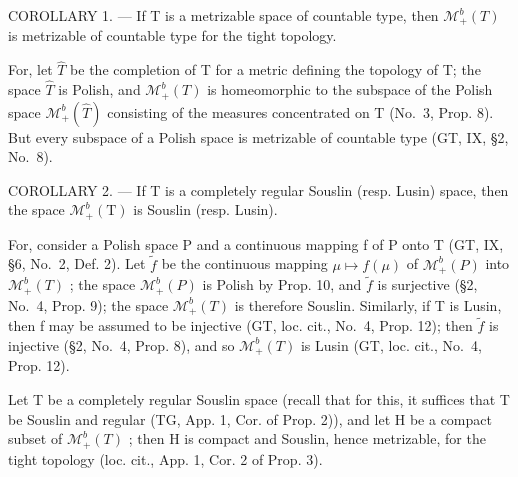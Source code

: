 COROLLARY 1. --- If T is a metrizable space of countable type, then \(\mathcal{M}_{+}^{b}(T)\) is metrizable of countable type for the tight topology.

For, let \(\widehat{T}\) be the completion of T for a metric defining the topology of T; the space \(\widehat{T}\) is Polish, and \(\mathcal{M}_{+}^{b}(T)\) is homeomorphic to the subspace of the Polish space \(\mathcal{M}_{+}^{b}(\widehat{T})\) consisting of the measures concentrated on T (No.~3, Prop. 8). But every subspace of a Polish space is metrizable of countable type (GT, IX, §2, No.~8).

COROLLARY 2. --- If T is a completely regular Souslin (resp. Lusin) space, then the space \(\mathcal{M}_{+}^{b}(\mathrm{T})\) is Souslin (resp. Lusin).

For, consider a Polish space P and a continuous mapping f of P onto T (GT, IX, §6, No.~2, Def. 2). Let \(\widetilde{f}\) be the continuous mapping \(\mu\mapsto f(\mu)\) of \(\mathcal{M}_{+}^{b}(P)\) into \(\mathcal{M}_{+}^{b}(T)\) ; the space \(\mathcal{M}_{+}^{b}(P)\) is Polish by Prop. 10, and \(\widetilde{f}\) is surjective (§2, No.~4, Prop. 9); the space \(\mathcal{M}_{+}^{b}(T)\) is therefore Souslin. Similarly, if T is Lusin, then f may be assumed to be injective (GT, loc. cit., No.~4, Prop. 12); then \(\widetilde{f}\) is injective (§2, No.~4, Prop. 8), and so \(\mathcal{M}_{+}^{b}(T)\) is Lusin (GT, loc. cit., No.~4, Prop. 12).

Let T be a completely regular Souslin space (recall that for this, it suffices that T be Souslin and regular (TG, App. 1, Cor. of Prop. 2)), and let H be a compact subset of \(\mathcal{M}_{+}^{b}(T)\) ; then H is compact and Souslin, hence metrizable, for the tight topology (loc. cit., App. 1, Cor. 2 of Prop. 3).

